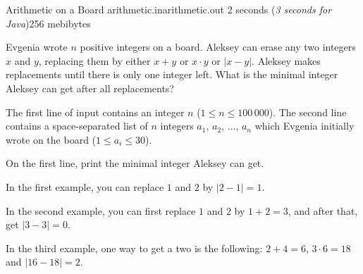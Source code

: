 \gdef\thisproblemauthor{Ivan Kazmenko}
\gdef\thisproblemdeveloper{Ivan Kazmenko}
\gdef\thisproblemorigin{\texttt{XXXIII} St. Petersburg State University Championship}
\begin{problem}{Arithmetic on a Board}
{arithmetic.in}{arithmetic.out}
{2 seconds (\textsl{3 seconds for Java})}{256 mebibytes}{}

Evgenia wrote $n$ positive integers on a board.
Aleksey can erase any two integers $x$ and $y$, replacing them
by either $x + y$ or $x \cdot y$ or $|x - y|$.
Aleksey makes replacements until there is only one integer left.
What is the minimal integer Aleksey can get after all replacements?

\InputFile

The first line of input contains an integer $n$
($1 \le n \le 100\,000$).
The second line contains a space-separated list of $n$ integers
$a_1$, $a_2$, $\ldots$, $a_n$ which Evgenia initially wrote on the board
($1 \le a_i \le 30$).

\OutputFile

On the first line, print the minimal integer Aleksey can get.

\Examples

\begin{example}
%
%
%
\end{example}

\Explanations

In the first example, you can replace $1$ and $2$ by $|2 - 1| = 1$.

In the second example, you can first replace $1$ and $2$ by $1 + 2 = 3$,
and after that, get $|3 - 3| = 0$.

In the third example, one way to get a two is the following:
$2 + 4 = 6$, $3 \cdot 6 = 18$ and $|16 - 18| = 2$.

\end{problem}
